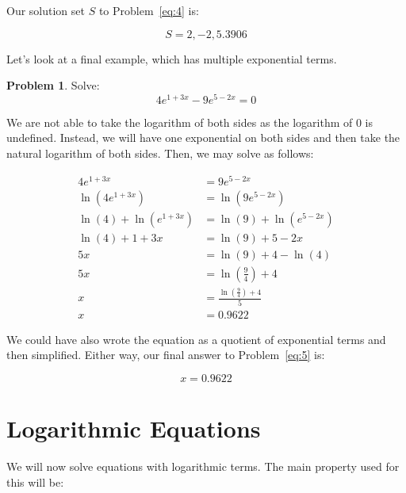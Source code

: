 \documentclass[12pt]{article}
\theoremstyle{definition}
\newtheorem{problem}{Problem}
\begin{document}
Our solution set $S$ to Problem~\eqref{eq:4} is:

\begin{equation}
    S = {2, -2, 5.3906}
\end{equation}

Let's look at a final example, which has multiple exponential terms.

\begin{problem}
Solve:
\begin{equation*}
    4e^{1+3x} - 9e^{5-2x} = 0 \label{eq:5}
\end{equation*}
\end{problem}

We are not able to take the logarithm of both sides as the logarithm of 0 is undefined.
Instead, we will have one exponential on both sides and then take the natural logarithm of both sides.
Then, we may solve as follows:

\begin{align}
    4e^{1+3x}              & = 9e^{5-2x}                               \\
    \ln(4e^{1+3x})         & = \ln(9e^{5-2x})                          \\
    \ln(4) + \ln(e^{1+3x}) & = \ln(9) + \ln(e^{5-2x})                  \\
    \ln(4) + 1+3x          & = \ln(9) + 5-2x                           \\
    5x                     & = \ln(9) + 4 - \ln(4)                     \\
    5x                     & = \ln\left(\frac{9}{4}\right)+4           \\
    x                      & = \frac{\ln\left(\frac{9}{4}\right)+4}{5} \\
    x                      & = 0.9622
\end{align}

We could have also wrote the equation as a quotient of exponential terms and then simplified.
Either way, our final answer to Problem~\eqref{eq:5} is:

\begin{equation}
    x = 0.9622
\end{equation}

\section{Logarithmic Equations}
We will now solve equations with logarithmic terms.
The main property used for this will be:
\end{document}
